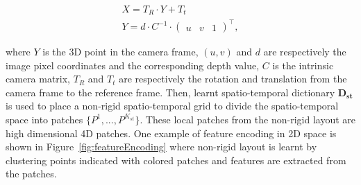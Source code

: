 \begin{equation}
\begin{array}{c}
X=T_{R}\cdot Y+T_{t}\\
Y=d\cdot C^{-1}\cdot\left(\begin{array}{ccc}
u & v & 1\end{array}\right)^{\top},
\end{array}
\end{equation}

where $Y$ is the 3D point in the camera frame, $\left(u,v\right)$
and $d$ are respectively the image pixel coordinates and the corresponding
depth value, $C$ is the intrinsic camera matrix, $T_{R}$
and $T_{t}$ are respectively the rotation and translation from the
camera frame to the reference frame. Then, learnt spatio-temporal dictionary $\mathbf{D_{st}}$ is used to place a non-rigid spatio-temporal grid to divide the spatio-temporal space into patches $\{P^{1},...,P^{K_{st}}\}$. These local patches from the non-rigid layout are high dimensional 4D patches. One example of feature encoding in 2D space is shown in Figure~\ref{fig:featureEncoding} where non-rigid layout is learnt by clustering points indicated with colored patches and features are extracted from the patches.

